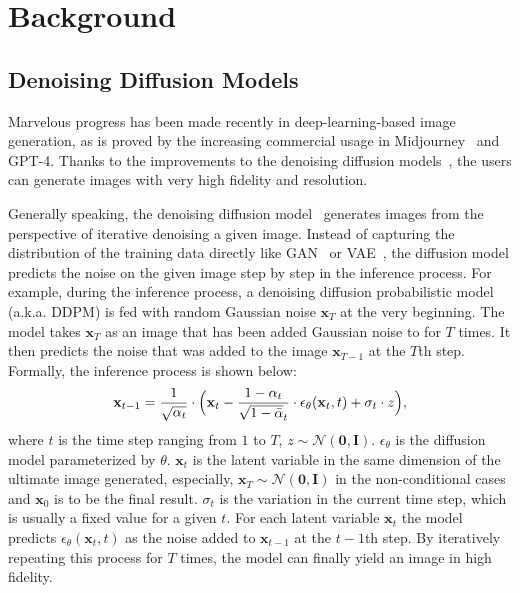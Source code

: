 \section{Background}
\label{sec:bg}
\vspace{-5pt}
\subsection{Denoising Diffusion Models}
Marvelous progress has been made recently in deep-learning-based image generation, as is proved by the increasing commercial usage in Midjourney~\cite{midjourney} and GPT-4. Thanks to the improvements to the denoising diffusion models~\cite{DDPM, DDIM, Classifierfreeguidiance}, the users can generate images with very high fidelity and resolution.

Generally speaking, the denoising diffusion model~\cite{DDPM, DDIM} generates images from the perspective of iterative denoising a given image. Instead of capturing the distribution of the training data directly like GAN~\cite{GAN_implicit, song2019generative} or VAE~\cite{VAE}, the diffusion model predicts the noise on the given image step by step in the inference process. For example, during the inference process, a denoising diffusion probabilistic model~\cite{DDPM} (a.k.a. DDPM) is fed with random Gaussian noise $\mathbf{x}_T$ at the very beginning. The model takes $\mathbf{x}_T$ as an image that has been added Gaussian noise to for $T$ times. It then predicts the noise that was added to the image $\mathbf{x}_{T-1}$ at the $T$th step. Formally, the inference process is shown below:
\begin{equation}
    \mathbf{x}_{t-1}=\frac{1}{\sqrt{\alpha_t}}\cdot\Big(\mathbf{x}_t-\frac{1-\alpha_t}{\sqrt{1-\Bar{\alpha}}_t}\cdot \epsilon_\theta(\mathbf{x}_t, t)+\sigma_t\cdot z \Big),
\end{equation}
where $t$ is the time step ranging from $1$ to $T$, $z\sim\mathcal{N}(\mathbf{0}, \mathbf{I})$. $\epsilon_\theta$ is the diffusion model parameterized by $\theta$. $\mathbf{x}_t$ is the latent variable in the same dimension of the ultimate image generated, especially, $\mathbf{x}_T\sim\mathcal{N}(\mathbf{0}, \mathbf{I})$ in the non-conditional cases and $\mathbf{x}_0$ is to be the final result. $\sigma_t$ is the variation in the current time step, which is usually a fixed value for a given $t$. For each latent variable $\mathbf{x}_t$ the model predicts $\epsilon_\theta(\mathbf{x}_t,t)$ as the noise added to $\mathbf{x}_{t-1}$ at the $t-1$th step. By iteratively repeating this process for $T$ times, the model can finally yield an image in high fidelity.

